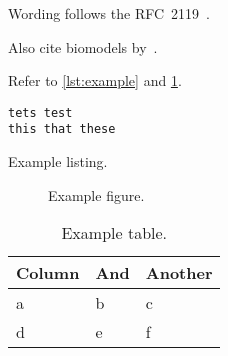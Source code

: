 Wording follows the RFC~2119~\cite{rfc2119}.

Also cite biomodels by~\citeauthor{malik2020biomodels}.

Refer to \cref{lst:example} and \cref{fig:example}.

\begin{listing}
\begin{lstlisting}
tets test
this that these
\end{lstlisting}
\caption[Example]{Example listing.}
\label{lst:example}
\end{listing}

\begin{figure}
\begin{center}\end{center}
\caption[Example]{Example figure.}
\label{fig:example}
\end{figure}

\begin{table}\tablefont
\begin{tabular}{lll}
\toprule
Column & And & Another \\
\midrule
a & b & c \\
d & e & f \\
\bottomrule
\end{tabular}
\caption[Example]{Example table.}
\label{tab:example}
\end{table}
\fi
